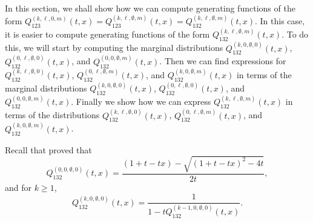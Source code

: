 \documentclass[
final,nomarks
]{dmtcs-episciences}
\newcommand{\Qmm}[1]{Q_{132}^{(#1)}(t,x)}
\newcommand{\Qm}[1]{Q_{123}^{(#1)}(t,x)}
\begin{document}
In this section, we shall show how we can compute generating functions 
of the form  \begin{math}\Qm{k,\ell,0,m}=\Qm{k,\ell,\emptyset,m}=\Qmm{k,\ell,\emptyset,m}\end{math}.  In 
this case, it is easier to compute generating functions of the form 
\begin{math}\Qmm{k,\ell,\emptyset,m}\end{math}. To do this, we will start by computing 
the marginal distributions \begin{math}\Qmm{k,0,\emptyset,0}\end{math}, \begin{math}\Qmm{0,\ell,\emptyset,0}\end{math}, and 
\begin{math}\Qmm{0,0,\emptyset,m}\end{math}. Then we can find expressions for 
\begin{math}\Qmm{k,\ell,\emptyset,0}\end{math}, \begin{math}\Qmm{0,\ell,\emptyset,m}\end{math}, 
and \begin{math}\Qmm{k,0,\emptyset,m}\end{math} in terms of the marginal distributions \begin{math}\Qmm{k,0,\emptyset,0}\end{math}, \begin{math}\Qmm{0,\ell,\emptyset,0}\end{math}, and \\
\begin{math}\Qmm{0,0,\emptyset,m}\end{math}. Finally we show how we can express 
\begin{math}\Qmm{k,\ell,\emptyset,m }\end{math} in terms of the distributions 
\begin{math}\Qmm{k,\ell,\emptyset,0}\end{math}, \begin{math}\Qmm{0,\ell,\emptyset,m}\end{math}, 
and \begin{math}\Qmm{k,0,\emptyset,m}\end{math}.




Recall that \cite{KRT1} proved that 
\begin{equation}
\Qmm{0,0,\emptyset,0}=\frac{(1+t-t x)-\sqrt{(1+t-t x)^2-4 t}}{2 t},
\end{equation}
and for \begin{math}k\geq 1\end{math},
\begin{equation}
\Qmm{k,0,\emptyset,0}=\frac{1}{1-t \Qmm{k-1,0,\emptyset,0}}.
\end{equation}
\end{document}
